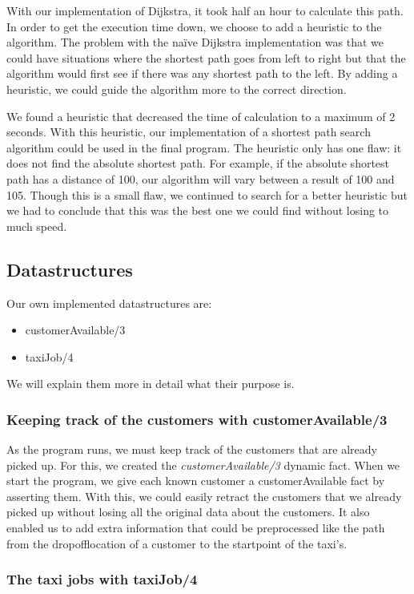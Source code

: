 \documentclass[10pt,a4paper]{article}
\begin{document}
With our implementation of Dijkstra, it took half an hour to calculate this path. In order to get the execution time down, we choose to add a heuristic to the algorithm. The problem with the naïve Dijkstra implementation was that we could have situations where the shortest path goes from left to right but that the algorithm would first see if there was any shortest path to the left. By adding a heuristic, we could guide the algorithm more to the correct direction.

We found a heuristic that decreased the time of calculation to a maximum of 2 seconds. With this heuristic, our implementation of a shortest path search algorithm could be used in the final program. The heuristic only has one flaw: it does not find the absolute shortest path. For example, if the absolute shortest path has a distance of 100, our algorithm will vary between a result of 100 and 105. Though this is a small flaw, we continued to search for a better heuristic but we had to conclude that this was the best one we could find without losing to much speed.

\subsection{Datastructures}

Our own implemented datastructures are:
\begin{itemize}
\item customerAvailable/3
\item taxiJob/4
\end{itemize}
We will explain them more in detail what their purpose is.

\subsubsection{Keeping track of the customers with customerAvailable/3}

As the program runs, we must keep track of the customers that are already picked up. For this, we created the \textit{customerAvailable/3} dynamic fact. When we start the program, we give each known customer a customerAvailable fact by asserting them. With this, we could easily retract the customers that we already picked up without losing all the original data about the customers. It also enabled us to add extra information that could be preprocessed like the path from the dropofflocation of a customer to the startpoint of the taxi's.

\subsubsection{The taxi jobs with taxiJob/4}
\end{document}
